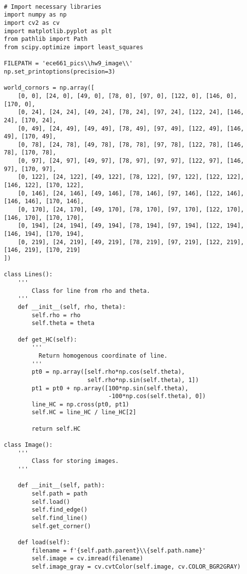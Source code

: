 \documentclass[11pt]{article}
\begin{document}
\begin{lstlisting}

# Import necessary libraries
import numpy as np
import cv2 as cv
import matplotlib.pyplot as plt
from pathlib import Path
from scipy.optimize import least_squares

FILEPATH = 'ece661_pics\\hw9_image\\'
np.set_printoptions(precision=3)

world_cornors = np.array([
    [0, 0], [24, 0], [49, 0], [78, 0], [97, 0], [122, 0], [146, 0], [170, 0],
    [0, 24], [24, 24], [49, 24], [78, 24], [97, 24], [122, 24], [146, 24], [170, 24],
    [0, 49], [24, 49], [49, 49], [78, 49], [97, 49], [122, 49], [146, 49], [170, 49],
    [0, 78], [24, 78], [49, 78], [78, 78], [97, 78], [122, 78], [146, 78], [170, 78],
    [0, 97], [24, 97], [49, 97], [78, 97], [97, 97], [122, 97], [146, 97], [170, 97],
    [0, 122], [24, 122], [49, 122], [78, 122], [97, 122], [122, 122], [146, 122], [170, 122],
    [0, 146], [24, 146], [49, 146], [78, 146], [97, 146], [122, 146], [146, 146], [170, 146],
    [0, 170], [24, 170], [49, 170], [78, 170], [97, 170], [122, 170], [146, 170], [170, 170],
    [0, 194], [24, 194], [49, 194], [78, 194], [97, 194], [122, 194], [146, 194], [170, 194],
    [0, 219], [24, 219], [49, 219], [78, 219], [97, 219], [122, 219], [146, 219], [170, 219]
])

class Lines():
    '''
        Class for line from rho and theta.
    '''
    def __init__(self, rho, theta):
        self.rho = rho
        self.theta = theta
    
    def get_HC(self):
        '''
          Return homogenous coordinate of line.
        '''
        pt0 = np.array([self.rho*np.cos(self.theta), 
                        self.rho*np.sin(self.theta), 1])
        pt1 = pt0 + np.array([100*np.sin(self.theta), 
                              -100*np.cos(self.theta), 0])
        line_HC = np.cross(pt0, pt1)
        self.HC = line_HC / line_HC[2]

        return self.HC

class Image():
    ''' 
        Class for storing images.
    '''
    
    def __init__(self, path):
        self.path = path   
        self.load() 
        self.find_edge()
        self.find_line()
        self.get_corner()

    def load(self):
        filename = f'{self.path.parent}\\{self.path.name}'
        self.image = cv.imread(filename)
        self.image_gray = cv.cvtColor(self.image, cv.COLOR_BGR2GRAY)


\end{lstlisting}
\end{document}
